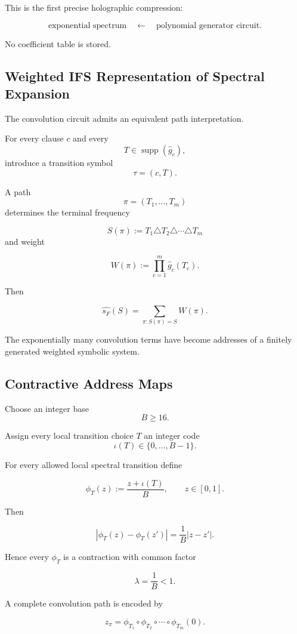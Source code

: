 \documentclass[11pt]{article}
\theoremstyle{plain}
\theoremstyle{definition}
\begin{document}
This is the first precise holographic compression:

\[
\boxed{
\text{exponential spectrum}
\quad\longleftarrow\quad
\text{polynomial generator circuit}.
}
\]

No coefficient table is stored.

\subsection{Weighted IFS Representation of Spectral Expansion}

The convolution circuit admits an equivalent path interpretation.

For every clause \(c\) and every
\[
    T\in\operatorname{supp}(\widehat g_c),
\]
introduce a transition symbol
\[
    \tau=(c,T).
\]

A path
\[
    \pi=(T_1,\dots,T_m)
\]
determines the terminal frequency

\[
    S(\pi)
    :=
    T_1\triangle T_2\triangle\cdots\triangle T_m
\]
and weight

\[
    W(\pi)
    :=
    \prod_{c=1}^{m}
    \widehat g_c(T_c).
\]

Then

\[
\boxed{
\widehat{s_F}(S)
=
\sum_{\pi:S(\pi)=S}
W(\pi).
}
\]

The exponentially many convolution terms have become addresses of a
finitely generated weighted symbolic system.

\subsection{Contractive Address Maps}

Choose an integer base
\[
    B\geq 16.
\]

Assign every local transition choice \(T\) an integer code
\[
    \iota(T)\in\{0,\dots,B-1\}.
\]

For every allowed local spectral transition define

\[
    \phi_T(z)
    :=
    \frac{z+\iota(T)}{B},
    \qquad
    z\in[0,1].
\]

Then

\[
    |\phi_T(z)-\phi_T(z')|
    =
    \frac1B |z-z'|.
\]

Hence every \(\phi_T\) is a contraction with common factor

\[
    \lambda=\frac1B<1.
\]

A complete convolution path is encoded by

\[
    z_\pi
    =
    \phi_{T_1}
    \circ
    \phi_{T_2}
    \circ\cdots\circ
    \phi_{T_m}(0).
\]
\end{document}
